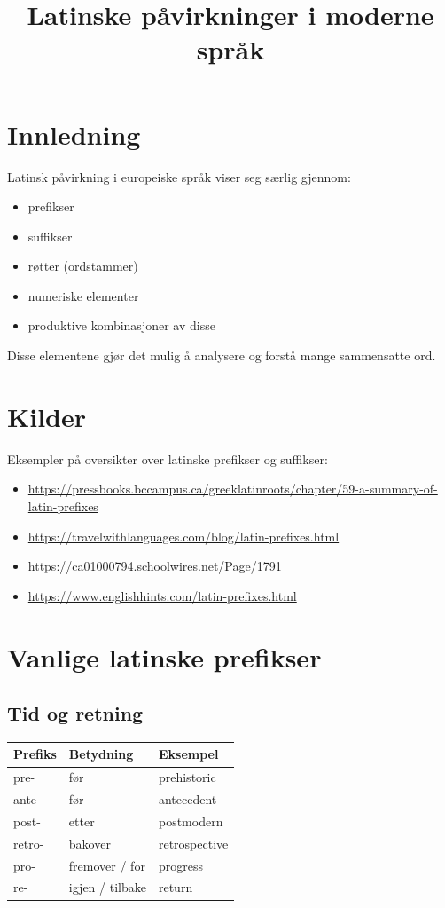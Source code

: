 \documentclass{article}
\title{Latinske påvirkninger i moderne språk}
\author{}
\date{}
\begin{document}
\maketitle

\section{Innledning}

Latinsk påvirkning i europeiske språk viser seg særlig gjennom:
\begin{itemize}
\item prefikser
\item suffikser
\item røtter (ordstammer)
\item numeriske elementer
\item produktive kombinasjoner av disse
\end{itemize}

Disse elementene gjør det mulig å analysere og forstå mange sammensatte ord.

\section{Kilder}

Eksempler på oversikter over latinske prefikser og suffikser:

\begin{itemize}
\item \url{https://pressbooks.bccampus.ca/greeklatinroots/chapter/59-a-summary-of-latin-prefixes}
\item \url{https://travelwithlanguages.com/blog/latin-prefixes.html}
\item \url{https://ca01000794.schoolwires.net/Page/1791}
\item \url{https://www.englishhints.com/latin-prefixes.html}
\end{itemize}

\section{Vanlige latinske prefikser}

\subsection{Tid og retning}

\begin{tabular}{lll}
\toprule
Prefiks & Betydning & Eksempel \\
\midrule
pre- & før & prehistoric \\
ante- & før & antecedent \\
post- & etter & postmodern \\
retro- & bakover & retrospective \\
pro- & fremover / for & progress \\
re- & igjen / tilbake & return \\
\bottomrule
\end{tabular}
\end{document}

